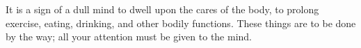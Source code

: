 It is a  sign of a dull  mind to dwell upon  the cares of the  body, to prolong
exercise, eating, drinking, and other bodily  functions. These things are to be
done by the way; all your attention must be given to the mind.
